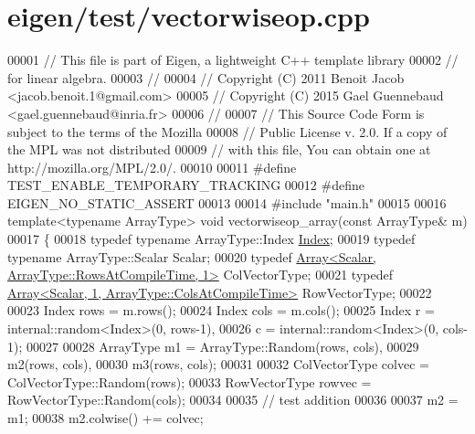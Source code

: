 \hypertarget{eigen_2test_2vectorwiseop_8cpp_source}{}\section{eigen/test/vectorwiseop.cpp}
\label{eigen_2test_2vectorwiseop_8cpp_source}

\begin{DoxyCode}
00001 \textcolor{comment}{// This file is part of Eigen, a lightweight C++ template library}
00002 \textcolor{comment}{// for linear algebra.}
00003 \textcolor{comment}{//}
00004 \textcolor{comment}{// Copyright (C) 2011 Benoit Jacob <jacob.benoit.1@gmail.com>}
00005 \textcolor{comment}{// Copyright (C) 2015 Gael Guennebaud <gael.guennebaud@inria.fr>}
00006 \textcolor{comment}{//}
00007 \textcolor{comment}{// This Source Code Form is subject to the terms of the Mozilla}
00008 \textcolor{comment}{// Public License v. 2.0. If a copy of the MPL was not distributed}
00009 \textcolor{comment}{// with this file, You can obtain one at http://mozilla.org/MPL/2.0/.}
00010 
00011 \textcolor{preprocessor}{#define TEST\_ENABLE\_TEMPORARY\_TRACKING}
00012 \textcolor{preprocessor}{#define EIGEN\_NO\_STATIC\_ASSERT}
00013 
00014 \textcolor{preprocessor}{#include "main.h"}
00015 
00016 \textcolor{keyword}{template}<\textcolor{keyword}{typename} ArrayType> \textcolor{keywordtype}{void} vectorwiseop\_array(\textcolor{keyword}{const} ArrayType& m)
00017 \{
00018   \textcolor{keyword}{typedef} \textcolor{keyword}{typename} ArrayType::Index \hyperlink{namespace_eigen_a62e77e0933482dafde8fe197d9a2cfde}{Index};
00019   \textcolor{keyword}{typedef} \textcolor{keyword}{typename} ArrayType::Scalar Scalar;
00020   \textcolor{keyword}{typedef} \hyperlink{group___core___module_class_eigen_1_1_array}{Array<Scalar, ArrayType::RowsAtCompileTime, 1>} 
      ColVectorType;
00021   \textcolor{keyword}{typedef} \hyperlink{group___core___module_class_eigen_1_1_array}{Array<Scalar, 1, ArrayType::ColsAtCompileTime>} 
      RowVectorType;
00022 
00023   Index rows = m.rows();
00024   Index cols = m.cols();
00025   Index r = internal::random<Index>(0, rows-1),
00026         c = internal::random<Index>(0, cols-1);
00027 
00028   ArrayType m1 = ArrayType::Random(rows, cols),
00029             m2(rows, cols),
00030             m3(rows, cols);
00031 
00032   ColVectorType colvec = ColVectorType::Random(rows);
00033   RowVectorType rowvec = RowVectorType::Random(cols);
00034 
00035   \textcolor{comment}{// test addition}
00036 
00037   m2 = m1;
00038   m2.colwise() += colvec;

\end{DoxyCode}
